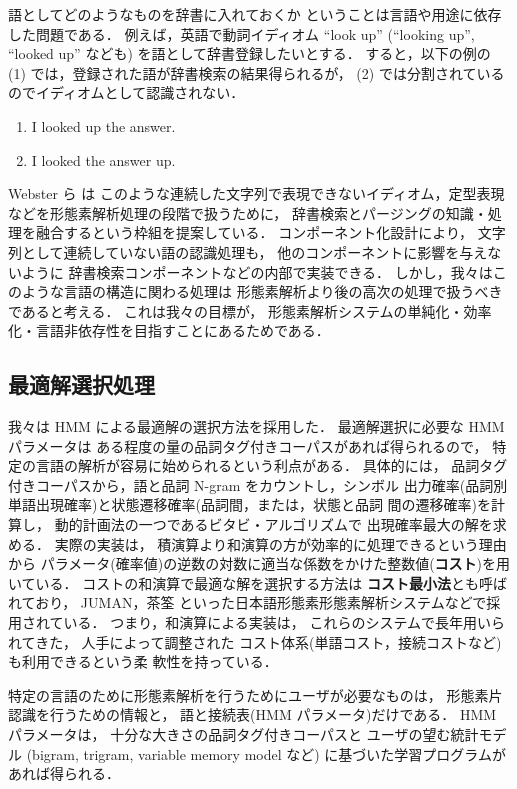語としてどのようなものを辞書に入れておくか
ということは言語や用途に依存した問題である．
例えば，英語で動詞イディオム
``look up'' (``looking up'', ``looked up'' なども)
を語として辞書登録したいとする．
すると，以下の例の (1) では，登録された語が辞書検索の結果得られるが，
(2) では分割されているのでイディオムとして認識されない．
\begin{enumerate}
\item 
I looked up the answer.

\item 
I looked the answer up.
\end{enumerate}
Webster ら\cite{Webster92} は
このような連続した文字列で表現できないイディオム，定型表現
などを形態素解析処理の段階で扱うために，
辞書検索とパージングの知識・処理を融合するという枠組を提案している．
コンポーネント化設計により，
文字列として連続していない語の認識処理も，
他のコンポーネントに影響を与えないように
辞書検索コンポーネントなどの内部で実装できる．
しかし，我々はこのような言語の構造に関わる処理は
形態素解析より後の高次の処理で扱うべきであると考える．
これは我々の目標が，
形態素解析システムの単純化・効率化・言語非依存性を目指すことにあるためである．



\subsection{最適解選択処理}\label{comp:lattice}

我々は HMM による最適解の選択方法を採用した．
最適解選択に必要な HMM パラメータは
ある程度の量の品詞タグ付きコーパスがあれば得られるので，
特定の言語の解析が容易に始められるという利点がある．
具体的には，
品詞タグ付きコーパスから，語と品詞 N-gram をカウントし，シンボル
出力確率(品詞別単語出現確率)と状態遷移確率(品詞間，または，状態と品詞
間の遷移確率)を計算し，
動的計画法の一つであるビタビ・アルゴリズムで
出現確率最大の解を求める．
実際の実装は，
積演算より和演算の方が効率的に処理できるという理由から\cite{Manning99}
パラメータ(確率値)の逆数の対数に適当な係数をかけた整数値({\bf コスト})を用いている．
コストの和演算で最適な解を選択する方法は
{\bf コスト最小法}とも呼ばれており\cite{永田97}\cite{長尾96}，
JUMAN\cite{JUMAN98}，茶筌\cite{ChaSen99}
といった日本語形態素形態素解析システムなどで採用されている．
つまり，和演算による実装は，
これらのシステムで長年用いられてきた，
人手によって調整された
コスト体系(単語コスト，接続コストなど)も利用できるという柔
軟性を持っている．

特定の言語のために形態素解析を行うためにユーザが必要なものは，
形態素片認識を行うための情報と，
語と接続表(HMM パラメータ)だけである．
HMM パラメータは，
十分な大きさの品詞タグ付きコーパスと
ユーザの望む統計モデル
(bigram, trigram, variable memory model\cite{Haruno97} など)
に基づいた学習プログラムがあれば得られる．


